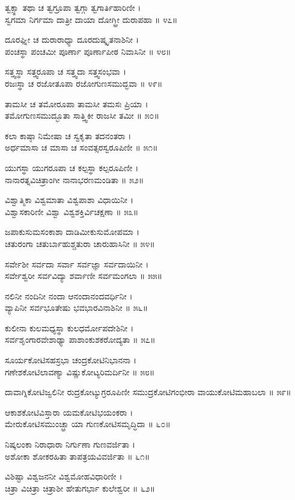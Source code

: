 ತ್ವಕ್ಸ್ಥಾ ತಥಾ ಚ ತ್ವಗ್ರೂಪಾ ತ್ವಗ್ಗಾ ತ್ವಗಾರ್ತಿಹಾರಿಣೀ ।\\
ಸ್ವಗಮಾ ನಿರ್ಗಮಾ ದಾತ್ರೀ ದಾಯಾ ದೋಗ್ಧ್ರೀ ದುರಾಪಹಾ ॥ ೪೭॥

ದೂರಘ್ನೀ ಚ ದುರಾರಾಧ್ಯಾ ದೂರದುಷ್ಕೃತನಾಶಿನೀ ।\\
ಪಂಚಸ್ಥಾ ಪಂಚಮೀ ಪೂರ್ಣಾ ಪೂರ್ಣಾಪೀಠ ನಿವಾಸಿನೀ ॥ ೪೮॥

ಸತ್ತ್ವಸ್ಥಾ ಸತ್ತ್ವರೂಪಾ ಚ ಸತ್ತ್ವದಾ ಸತ್ತ್ವಸಂಭವಾ ।\\
ರಜಃಸ್ಥಾ ಚ ರಜೋತೂಪಾ ರಜೋಗುಣಸಮುದ್ಭವಾ ॥ ೪೯॥

ತಾಮಸೀ ಚ ತಮೋರೂಪಾ ತಾಮಸೀ ತಮಸಃ ಪ್ರಿಯಾ ।\\
ತಮೋಗುಣಸಮುದ್ಭೂತಾ ಸಾತ್ತ್ವಿಕೀ ರಾಜಸೀ ತಮೀ ॥ ೫೦॥

ಕಲಾ ಕಾಷ್ಠಾ ನಿಮೇಷಾ ಚ ಸ್ವಕೃತಾ ತದನಂತರಾ ।\\
ಅರ್ಧಮಾಸಾ ಚ ಮಾಸಾ ಚ ಸಂವತ್ಸರಸ್ವರೂಪಿಣೀ ॥ ೫೧॥

ಯುಗಸ್ಥಾ ಯುಗರೂಪಾ ಚ ಕಲ್ಪಸ್ಥಾ ಕಲ್ಪರೂಪಿಣೀ ।\\
ನಾನಾರತ್ನವಿಚಿತ್ರಾಂಗೀ ನಾನಾಭರಣಮಂಡಿತಾ ॥ ೫೨॥

ವಿಶ್ವಾತ್ಮಿಕಾ ವಿಶ್ವಮಾತಾ ವಿಶ್ವಪಾಶಾ ವಿಧಾಯಿನೀ ।\\
ವಿಶ್ವಾಸಕಾರಿಣೀ ವಿಶ್ವಾ ವಿಶ್ವಶಕ್ತಿರ್ವಿಚಕ್ಷಣಾ ॥ ೫೩॥

ಜಪಾಕುಸುಮಸಂಕಾಶಾ ದಾಡಿಮೀಕುಸುಮೋಪಮಾ ।\\
ಚತುರಂಗಾ ಚತುರ್ಬಾಹುಶ್ಚತುರಾ ಚಾರುಹಾಸಿನೀ ॥ ೫೪॥

ಸರ್ವೇಶೀ ಸರ್ವದಾ ಸರ್ವಾ ಸರ್ವಜ್ಞಾ ಸರ್ವದಾಯಿನೀ ।\\
ಸರ್ವೇಶ್ವರೀ ಸರ್ವವಿದ್ಯಾ ಶರ್ವಾಣೀ ಸರ್ವಮಂಗಲಾ ॥ ೫೫॥

ನಲಿನೀ ನಂದಿನೀ ನಂದಾ ಆನಂದಾನಂದವರ್ಧಿನೀ ।\\
ವ್ಯಾಪಿನೀ ಸರ್ವಭೂತೇಷು ಭವಭಾರವಿನಾಶಿನೀ ॥ ೫೬॥

ಕುಲೀನಾ ಕುಲಮಧ್ಯಸ್ಥಾ ಕುಲಧರ್ಮೋಪದೇಶಿನೀ ।\\
ಸರ್ವಶೃಂಗಾರವೇಶಾಢ್ಯಾ ಪಾಶಾಂಕುಶಕರೋದ್ಯತಾ ॥ ೫೭॥

ಸೂರ್ಯಕೋಟಿಸಹಸ್ರಭಾ ಚಂದ್ರಕೋಟಿನಿಭಾನನಾ ।\\
ಗಣೇಶಕೋಟಿಲಾವಣ್ಯಾ ವಿಷ್ಣುಕೋಟ್ಯರಿಮರ್ದಿನೀ ॥ ೫೮॥

ದಾವಾಗ್ನಿಕೋಟಿಜ್ವಲಿನೀ ರುದ್ರಕೋಟ್ಯುಗ್ರರೂಪಿಣೀ
ಸಮುದ್ರಕೋಟಿಗಂಭೀರಾ ವಾಯುಕೋಟಿಮಹಾಬಲಾ ॥ ೫೯॥

ಆಕಾಶಕೋಟಿವಿಸ್ತಾರಾ ಯಮಕೋಟಿಭಯಂಕರಾ ।\\
ಮೇರುಕೋಟಿಸಮುಂಚ್ಛ್ರಾ ಯಾ ಗುಣಕೋಟಿಸಮೃದ್ಧಿದಾ ॥ ೬೦॥

ನಿಷ್ಕಲಂಕಾ ನಿರಾಧಾರಾ ನಿರ್ಗುಣಾ ಗುಣವರ್ಜಿತಾ ।\\
ಅಶೋಕಾ ಶೋಕರಹಿತಾ ತಾಪತ್ರಯವಿವರ್ಜಿತಾ ॥ ೬೧॥

ವಿಶಿಷ್ಟಾ ವಿಶ್ವಜನನೀ ವಿಶ್ವಮೋಹವಿಧಾರಿಣೀ ।\\
ಚಿತ್ರಾ ವಿಚಿತ್ರಾ ಚಿತ್ರಾಶೀ ಹೇತುಗರ್ಭಾ ಕುಲೇಶ್ವರೀ ॥ ೬೨॥

